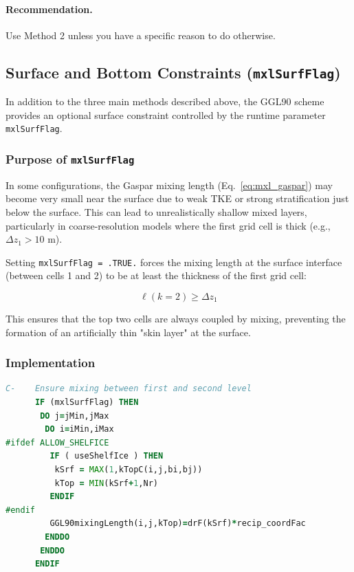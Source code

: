 \documentclass[12pt,letterpaper]{article}
\begin{document}
\paragraph{Recommendation.} Use Method 2 unless you have a specific reason to do otherwise.

\subsection{Surface and Bottom Constraints (\texttt{mxlSurfFlag})}
\label{sec:mxl_surface_constraints}

In addition to the three main methods described above, the GGL90 scheme provides an optional surface constraint controlled by the runtime parameter \verb|mxlSurfFlag|.

\subsubsection{Purpose of \texttt{mxlSurfFlag}}

In some configurations, the Gaspar mixing length (Eq.~\ref{eq:mxl_gaspar}) may become very small near the surface due to weak TKE or strong stratification just below the surface. This can lead to unrealistically shallow mixed layers, particularly in coarse-resolution models where the first grid cell is thick (e.g., $\Delta z_1 > 10$ m).

Setting \verb|mxlSurfFlag = .TRUE.| forces the mixing length at the surface interface (between cells 1 and 2) to be at least the thickness of the first grid cell:

\begin{equation}
\ell(k=2) \geq \Delta z_1
\end{equation}

This ensures that the top two cells are always coupled by mixing, preventing the formation of an artificially thin "skin layer" at the surface.

\subsubsection{Implementation}

\begin{lstlisting}[language=Fortran,caption={(ggl90\_mixinglength.F:L147--160) Surface constraint}]
C-    Ensure mixing between first and second level
      IF (mxlSurfFlag) THEN
       DO j=jMin,jMax
        DO i=iMin,iMax
#ifdef ALLOW_SHELFICE
         IF ( useShelfIce ) THEN
          kSrf = MAX(1,kTopC(i,j,bi,bj))
          kTop = MIN(kSrf+1,Nr)
         ENDIF
#endif
         GGL90mixingLength(i,j,kTop)=drF(kSrf)*recip_coordFac
        ENDDO
       ENDDO
      ENDIF
\end{lstlisting}
\end{document}
